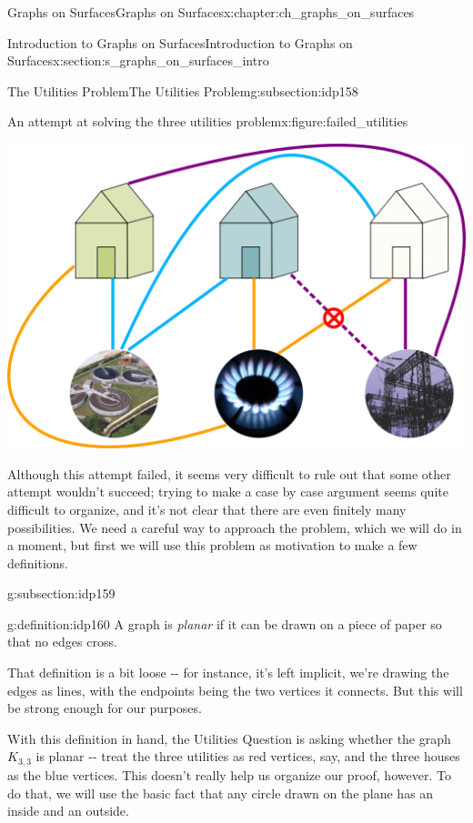 \documentclass[oneside,10pt,]{book}
\numberwithin{equation}{section}
\begin{document}
\begin{chapterptx}{Graphs on Surfaces}{}{Graphs on Surfaces}{}{}{x:chapter:ch_graphs_on_surfaces}
\begin{sectionptx}{Introduction to Graphs on Surfaces}{}{Introduction to Graphs on Surfaces}{}{}{x:section:s_graphs_on_surfaces_intro}
\begin{subsectionptx}{The Utilities Problem}{}{The Utilities Problem}{}{}{g:subsection:idp158}
\begin{figureptx}{An attempt at solving the three utilities problem}{x:figure:failed_utilities}{}
\begin{image}{0.15}{0.7}{0.15}
\includegraphics[width=\linewidth]{images/The-Utilities-Problem-Bad-Solution.png}
\end{image}%
\tcblower
\end{figureptx}%
Although this attempt failed, it seems very difficult to rule out that some other attempt wouldn't succeed; trying to make a case by case argument seems quite difficult to organize, and it's not clear that there are even finitely many possibilities.  We need a careful way to approach the problem, which we will do in a moment, but first we will use this problem as motivation to make a few definitions.%
\end{subsectionptx}
%
%
\typeout{************************************************}
\typeout{************************************************}
%
\begin{subsectionptx}{}{}{}{}{}{g:subsection:idp159}
\begin{definition}{}{g:definition:idp160}%
A graph is \emph{planar} if it can be drawn on a piece of paper so that no edges cross.%
\end{definition}
That definition is a bit loose -{}-{} for instance, it's left implicit, we're drawing the edges as lines, with the endpoints being the two vertices it connects.  But this will be strong enough for our purposes.%
\par
With this definition in hand, the Utilities Question is asking whether the graph \(K_{3,3}\) is planar -{}-{} treat the three utilities as red vertices, say, and the three houses as the blue vertices.  This doesn't really help us organize our proof, however. To do that, we will use the basic fact that any circle drawn on the plane has an inside and an outside.%
\par

\end{subsectionptx}
\end{sectionptx}
\end{chapterptx}
\end{document}
